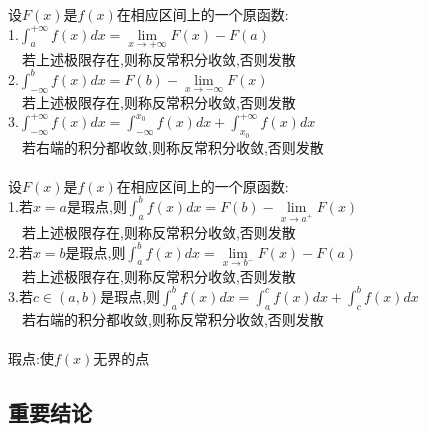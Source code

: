 \documentclass{article}
\begin{document}
\begin{flushleft}
	设$F(x)$是$f(x)$在相应区间上的一个原函数:\\
	1.$\int_{a}^{+\infty}f(x)dx=\lim\limits_{x\to+\infty}F(x)-F(a)$\\
	\ \ 若上述极限存在,则称反常积分收敛,否则发散\\
	2.$\int_{-\infty}^{b}f(x)dx=F(b)-\lim\limits_{x\to-\infty}F(x)$\\
	\ \ 若上述极限存在,则称反常积分收敛,否则发散\\
	3.$\int_{-\infty}^{+\infty}f(x)dx=\int_{-\infty}^{x_0}f(x)dx+\int_{x_0}^{+\infty}f(x)dx$\\
	\ \ 若右端的积分都收敛,则称反常积分收敛,否则发散\\
	~\\
	设$F(x)$是$f(x)$在相应区间上的一个原函数:\\
	1.若$x=a$是瑕点,则$\int_{a}^{b}f(x)dx=F(b)-\lim\limits_{x\to a^+}F(x)$\\
	\ \ 若上述极限存在,则称反常积分收敛,否则发散\\
	2.若$x=b$是瑕点,则$\int_{a}^{b}f(x)dx=\lim\limits_{x\to b^-}F(x)-F(a)$\\
	\ \ 若上述极限存在,则称反常积分收敛,否则发散\\
	3.若$c\in(a,b)$是瑕点,则$\int_{a}^{b}f(x)dx=\int_{a}^{c}f(x)dx+\int_{c}^{b}f(x)dx$\\
	\ \ 若右端的积分都收敛,则称反常积分收敛,否则发散\\
	~\\
	瑕点:使$f(x)$无界的点\\
	
	\subsection{重要结论}
	

\end{flushleft}
\end{document}
